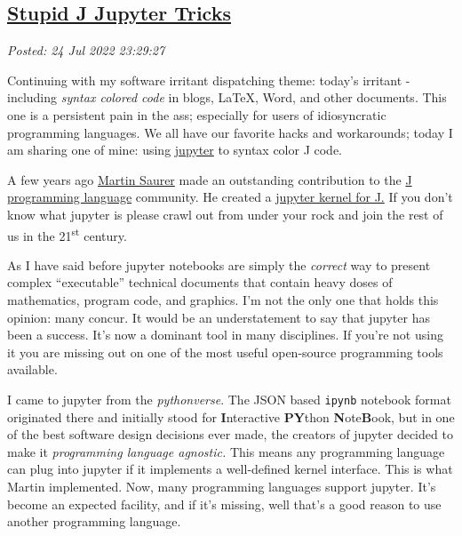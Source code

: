 %

\subsection*{\href{https://analyzethedatanotthedrivel.org/2022/07/24/stupid-j-jupyter-tricks/}{Stupid J Jupyter Tricks}}


\noindent\emph{Posted: 24 Jul 2022 23:29:27}
\vspace{6pt}

Continuing with my software irritant dispatching theme: today's irritant
- including \emph{syntax colored code} in blogs, \LaTeX, Word, and other
documents. This one is a persistent pain in the ass; especially for
users of idiosyncratic programming languages. We all have our favorite
hacks and workarounds; today I am sharing one of mine: using
\href{https://jupyter.org/}{jupyter} to syntax color J code.

A few years ago \href{https://github.com/martin-saurer}{Martin Saurer}
made an outstanding contribution to the
\href{https://code2.jsoftware.com/wiki/Main_Page}{J programming
language} community. He created a
\href{https://github.com/martin-saurer/jkernel}{jupyter kernel for J.}
If you don't know what jupyter is please crawl out from under your rock
and join the rest of us in the 21\textsuperscript{st} century.

As I have said before jupyter notebooks are simply the \emph{correct}
way to present complex ``executable'' technical documents that contain
heavy doses of mathematics, program code, and graphics. I'm not the only
one that holds this opinion: many concur. It would be an understatement
to say that jupyter has been a success. It's now a dominant tool in many
disciplines. If you're not using it you are missing out on one of the
most useful open-source programming tools available.

I came to jupyter from the \emph{pythonverse}. The JSON based \texttt{ipynb} notebook format
originated there and initially stood for \textbf{I}nteractive
\textbf{PY}thon \textbf{N}ote\textbf{B}ook, but in one of the best
software design decisions ever made, the creators of jupyter decided to
make it \emph{programming language agnostic.} This means any
programming language can plug into jupyter if it implements a
well-defined kernel interface. This is what Martin implemented. Now,
many programming languages support jupyter. It's become an expected
facility, and if it's missing, well that's a good reason to use another
programming language.

